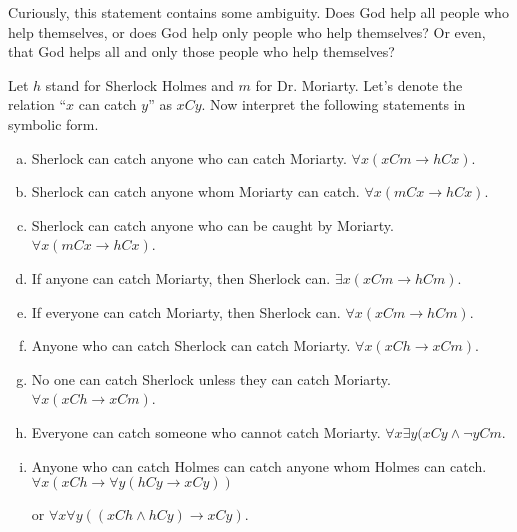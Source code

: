 \begin{example}
Curiously, this statement contains some ambiguity.  Does God help all people who help themselves, or does God help only people who help themselves?  Or even, that God helps all and only those people who help themselves?

\end{example}

\newpage
\begin{problem}
Let $h$ stand for Sherlock Holmes and $m$ for Dr. Moriarty.  Let's denote the relation ``$x$ can catch $y$'' as $xCy$.  Now interpret the following statements in symbolic form.
\begin{enumerate}[(a)]
\item Sherlock can catch anyone who can catch Moriarty.\hfill
\ifKey 
\color{red}$\forall x(xCm \rightarrow hCx)$.
\color{black}
 \else
{}		 
\fi  


\item Sherlock can catch anyone whom Moriarty can catch.\hfill \ifKey 
\color{red}$\forall x(mCx \rightarrow hCx)$.
\color{black}
 \else
{}		 
\fi  

\item Sherlock can catch anyone who can be caught by Moriarty.\hfill\ifKey 
\color{red}$\forall x(mCx \rightarrow hCx)$.
\color{black}
 \else
{}		 
\fi  
\item If anyone can catch Moriarty, then Sherlock can.\hfill
\ifKey 
\color{red}$\exists x(xCm \rightarrow hCm)$.
\color{black}
 \else
{}		 
\fi  
\item If everyone can catch Moriarty, then Sherlock can.\hfill
\ifKey 
\color{red}$\forall x(xCm \rightarrow hCm)$.
\color{black}
 \else
{}		 
\fi  
\item Anyone who can catch Sherlock can catch Moriarty.\hfill
\ifKey 
\color{red}$\forall x(xCh \rightarrow xCm)$.
\color{black}
 \else
{}		 
\fi  
\item No one can catch Sherlock unless they can catch Moriarty.\hfill
\ifKey 
\color{red}$\forall x(xCh \rightarrow xCm)$.
\color{black}
 \else
{}		 
\fi  

\item Everyone can catch someone who cannot catch Moriarty.\hfill\ifKey 
\color{red}$\forall x\exists y(xCy \land \neg yCm$.
\color{black}
 \else
{}		 
\fi  

\item Anyone who can catch Holmes can catch anyone whom Holmes can catch.
\ifKey 
\hfill \color{red}$\forall x(xCh \rightarrow \forall y(hCy\rightarrow xCy))$

\hfill or $\forall x\forall y((xCh \land hCy)\rightarrow xCy)$.
\color{black}
 \else
{}		 
\fi  

\end{enumerate}
\end{problem}

